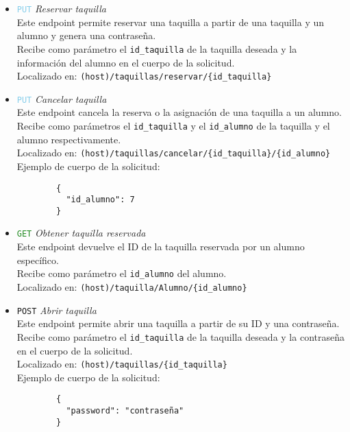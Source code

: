 \documentclass[12pt]{report}
\begin{document}
\begin{itemize}
\begin{itemize}
        \\Localizado en: \texttt{(host)/taquillas}
        \\Ejemplo de cuerpo de la solicitud:
        \begin{verbatim}
            {
                "ala": "este",
                "pasillo": 2,
                "piso": 2
            }
        \end{verbatim}
        \item \textcolor{SkyBlue}{\texttt{PUT}} \textit{Reservar taquilla}\\
        Este endpoint permite reservar una taquilla a partir de una taquilla y un alumno y genera una contraseña.\\
        Recibe como parámetro el \texttt{id\_taquilla} de la taquilla deseada y la información del alumno en el cuerpo de la solicitud.\\
        Localizado en: \texttt{(host)/taquillas/reservar/\{id\_taquilla\}}\\
       
        
        \item \textcolor{SkyBlue}{\texttt{PUT}} \textit{Cancelar taquilla}\\
        Este endpoint cancela la reserva o la asignación de una taquilla a un alumno.\\
        Recibe como parámetros el \texttt{id\_taquilla} y el \texttt{id\_alumno} de la taquilla y el alumno respectivamente.\\
        Localizado en: \texttt{(host)/taquillas/cancelar/\{id\_taquilla\}/\{id\_alumno\}}
                \\Ejemplo de cuerpo de la solicitud:
        \begin{verbatim}
        {
          "id_alumno": 7
        }
        \end{verbatim}
        
        
        
        \item \textcolor{ForestGreen}{\texttt{GET}} \textit{Obtener taquilla reservada}\\
        Este endpoint devuelve el ID de la taquilla reservada por un alumno específico.\\
        Recibe como parámetro el \texttt{id\_alumno} del alumno.\\
        Localizado en: \texttt{(host)/taquilla/Alumno/\{id\_alumno\}}
        \item \textcolor{YellowOrange}{\texttt{POST}} \textit{Abrir taquilla}\\
        Este endpoint permite abrir una taquilla a partir de su ID y una contraseña.\\
        Recibe como parámetro el \texttt{id\_taquilla} de la taquilla deseada y la contraseña en el cuerpo de la solicitud.\\
        Localizado en: \texttt{(host)/taquillas/\{id\_taquilla\}}\\
        Ejemplo de cuerpo de la solicitud:
        \begin{verbatim}
        {
          "password": "contraseña"
        }
        \end{verbatim}
        

\end{itemize}
\end{itemize}
\end{document}

